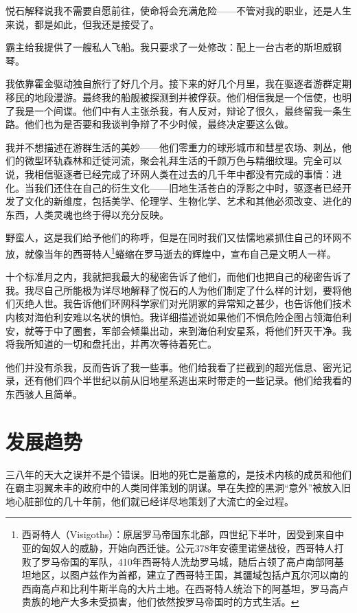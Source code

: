\documentclass[
  b5paper, 
  10pt, 
  AutoFakeBold, 
  AutoFakeSlant
]{article}
\begin{document}
悦石解释说我不需要自愿前往，使命将会充满危险——不管对我的职业，还是人生来说，都是如此，但我还是接受了。

霸主给我提供了一艘私人飞船。我只要求了一处修改：配上一台古老的斯坦威钢琴。

我依靠霍金驱动独自旅行了好几个月。接下来的好几个月里，我在驱逐者游群定期移民的地段漫游。最终我的船舰被探测到并被俘获。他们相信我是一个信使，也明了我是一个间谍。他们中有人主张杀我，有人反对，辩论了很久，最终留我一条生路。他们也为是否要和我谈判争辩了不少时候，最终决定要这么做。

我并不想描述在游群生活的美妙——他们零重力的球形城市和彗星农场、刺丛，他们的微型环轨森林和迁徙河流，聚会礼拜生活的千颜万色与精细纹理。完全可以说，我相信驱逐者已经完成了环网人类在过去的几千年中都没有完成的事情：进化。当我们还住在自己的衍生文化——旧地生活苍白的浮影之中时，驱逐者已经开发了文化的新维度，包括美学、伦理学、生物化学、艺术和其他必须改变、进化的东西，人类灵魂也终于得以充分反映。

野蛮人，这是我们给予他们的称呼，但是在同时我们又怯懦地紧抓住自己的环网不放，就像当年的西哥特人\footnote{西哥特人（Visigoths）：原居罗马帝国东北部，四世纪下半叶，因受到来自中亚的匈奴人的威胁，开始向西迁徙。公元378年安德里诺堡战役，西哥特人打败了罗马帝国的军队，410年西哥特人洗劫罗马城，随后占领了高卢南部阿基坦地区，以图卢兹作为首都，建立了西哥特王国，其疆域包括卢瓦尔河以南的西南高卢和比利牛斯半岛的大片土地。在西哥特人统治下的阿基坦，罗马高卢贵族的地产大多未受损害，他们依然按罗马帝国时的方式生活。}蜷缩在罗马逝去的辉煌中，宣布自己是文明人一样。

十个标准月之内，我就把我最大的秘密告诉了他们，而他们也把自己的秘密告诉了我。我尽自己所能极为详尽地解释了悦石的人为他们制定了什么样的计划，要将他们灭绝人世。我告诉他们环网科学家们对光阴冢的异常知之甚少，也告诉他们技术内核对海伯利安难以名状的惧怕。我详细描述说如果他们不惧危险企图占领海伯利安，就等于中了圈套，军部会倾巢出动，来到海伯利安星系，将他们歼灭干净。我将我所知道的一切和盘托出，并再次等待着死亡。

他们并没有杀我，反而告诉了我一些事。他们给我看了拦截到的超光信息、密光记录，还有他们四个半世纪以前从旧地星系逃出来时带走的一些记录。他们给我看的东西骇人且简单。

\section{发展趋势}

三八年的天大之误并不是个错误。旧地的死亡是蓄意的，是技术内核的成员和他们在霸主羽翼未丰的政府中的人类同伴策划的阴谋。早在失控的黑洞“意外”被放入旧地心脏部位的几十年前，他们就已经详尽地策划了大流亡的全过程。
\end{document}
